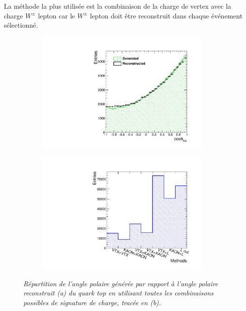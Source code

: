 La méthode la plus utilisée est la combinaison de la charge de vertex avec la charge $W^\pm$ lepton car le $ W^\pm$ lepton doit être reconstruit dans chaque événement sélectionné.

\begin{figure}
	\centering
	\begin{subfigure}{0.5\textwidth}
		\includegraphics[width=0.95\textwidth]{ILD/plots/top-asymmetry-lepton.pdf}
		\caption{\label{fig:TopAsymmetryChi_a_3F} }
	\end{subfigure}%
	\begin{subfigure}{0.5\textwidth}
		\centering
		\includegraphics[width=0.95\textwidth]{ILD/plots/top-methods-lepton.pdf}
		\caption{\label{fig:TopAsymmetryChi_b_3F} }
	\end{subfigure}
	\caption{\sl Répartition de l'angle polaire générée par rapport à l'angle polaire reconstruit (a) du quark top en utilisant toutes les combinaisons possibles de signature de charge, tracée en (b).}
	\label{fig:TopAsymmetryChi_3F}
\end{figure}

